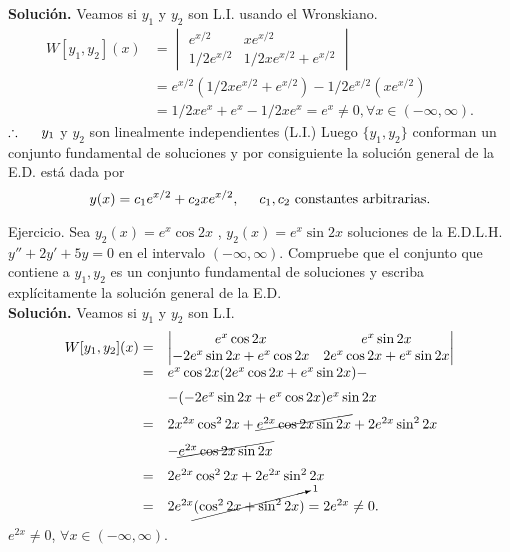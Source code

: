 \documentclass{beamer}
\begin{document}
\begin{frame}[t]
	\begin{exampleblock}{}
		\textbf{Solución.} Veamos si \(y_1\) y \(y_2\) son L.I. usando el Wronskiano.
		\[
			\begin{array}{rl}
				W[y_1,y_2] (x) & = \begin{vmatrix}
					e^{x/2} & xe^{x/2} \\
					1/2e^{x/2} & 1/2xe^{x/2} +e^{x/2}
				\end{vmatrix}\\[6mm]
				& = e^{x/2} (1/2xe^{x/2} +e^{x/2}) -1/2e^{x/2} (xe^{x/2}) \\[2mm]
				& = 1/2xe^x+e^x-1/2xe^x = e^x \ne 0, \forall x \in (- \infty , \infty) .
			\end{array}
		\]
		\(\therefore \hspace{5mm} y_1\) y \(y_2\) son linealmente independientes (L.I.) Luego \(\{y_1,y_2\}\) conforman un conjunto fundamental de soluciones y por consiguiente la solución general de la E.D. está dada por
		\[
			y(x) = c_1e^{x/2} + c_2xe^{x/2} , \hspace{5mm} c_1,c_2 \mbox{ constantes arbitrarias.}
		\]
	\end{exampleblock}
\end{frame}

\begin{frame}[t]
	\begin{alertblock}{Ejercicio.}
		Sea \(y_2(x) = e^x \cos 2x\) , \(y_2(x) = e^x \sin 2x\) soluciones de la E.D.L.H. \(y'' +2y' +5y=0\) en el intervalo \((- \infty , \infty)\).
		Compruebe que el conjunto que contiene a \(y_1,y_2\) es un conjunto fundamental de soluciones y escriba explícitamente la solución general de la E.D.\\
		\textbf{Solución.} Veamos si \(y_1\) y \(y_2\) son L.I.  \vspace{-3mm}
		\[
			\begin{array}{rl}
				W[y_1,y_2] (x) = & \begin{vmatrix}
					e^x \cos 2x & e^x \sin 2x \\
					-2e^x \sin 2x+e^x \cos 2x & 2e^x \cos 2x+e^x \sin 2x
				\end{vmatrix}\\[2mm]
				 = & e^x \cos 2x(2e^x \cos 2x+e^x \sin 2x) - \\[2mm]
				& - (-2e^x \sin 2x+ e^x \cos 2x) e^x \sin 2x \\[2mm]
				 = & 2x^{2x} \cos ^22x+ \cancel{e^{2x} \cos 2x \sin 2x} +2e^{2x} \sin ^2 2x  \\[2mm]
				& - \cancel{e^{2x} \cos 2x \sin 2x} \\[2mm]
				 = & 2e^{2x} \cos ^22x +2e^{2x} \sin ^22x \\
				 = & 2e^{2x} \cancelto{1}{(\cos ^22x+ \sin ^22x)} = 2e^{2x} \ne 0.
			\end{array} \vspace{-4mm}
		\]
		\(e^{2x} \ne 0\), \(\forall x \in (- \infty , \infty)\).
	\end{alertblock}
\end{frame}
\end{document}

